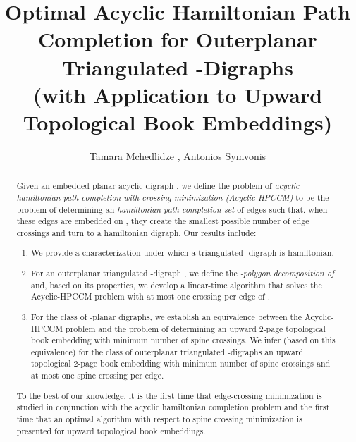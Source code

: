 \documentclass{myllncs-mixalis}
\begin{document}
\parindent=0cm
\parskip=5pt


\title{Optimal Acyclic Hamiltonian Path Completion for Outerplanar Triangulated
-Digraphs\\
(with Application to Upward Topological Book Embeddings)}
\author{
Tamara  Mchedlidze ,  Antonios Symvonis }


\maketitle

\vspace{-10pt}

\begin{abstract}

Given an embedded  planar acyclic digraph , we define the problem
of \emph{acyclic hamiltonian path completion with crossing
minimization (Acyclic-HPCCM)} to be the problem of determining an
\emph{hamiltonian path completion set} of edges such that, when
these edges are embedded on , they create the smallest possible
number of edge crossings and turn   to a hamiltonian digraph. Our
results include:
\begin{enumerate}
\item
We provide a characterization under which a triangulated
-digraph  is hamiltonian.
\item For an outerplanar triangulated -digraph ,
we define the \emph{-polygon decomposition of } and, based on
its properties, we develop a linear-time algorithm that solves the
Acyclic-HPCCM problem with at most one crossing per edge of .
\item
For the class of -planar digraphs, we establish an equivalence
between the Acyclic-HPCCM problem and the problem of determining an
upward 2-page topological book embedding with  minimum number of
spine crossings. We infer (based on this equivalence) for the class
of outerplanar triangulated -digraphs an upward topological
2-page book embedding with minimum number of spine crossings and at
most one spine crossing per edge.
\end{enumerate}

To the best of our knowledge, it is the first time  that
edge-crossing minimization is studied in conjunction with the
acyclic hamiltonian completion problem and the first time that an
optimal algorithm with respect to spine crossing minimization is
presented for upward topological book embeddings.
\end{abstract}
\end{document}
